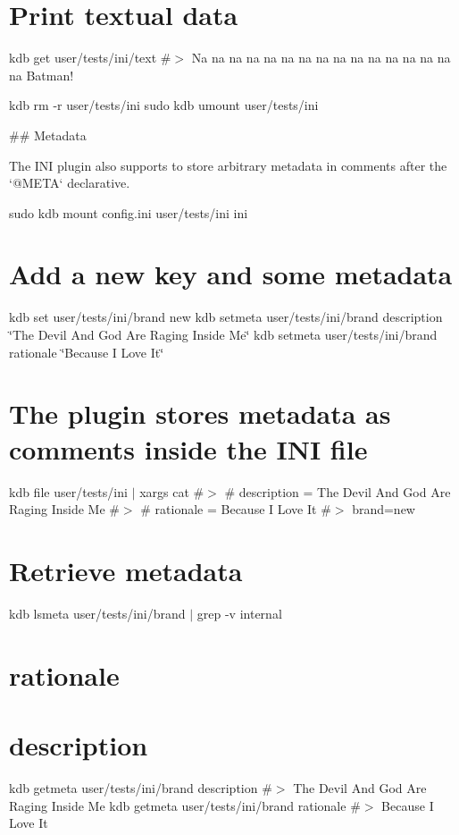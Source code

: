 \section*{Print textual data}

kdb get user/tests/ini/text \#$>$ Na na na na na na na na na na na na na na na na Batman!

kdb rm -\/r user/tests/ini sudo kdb umount user/tests/ini 
\begin{DoxyCode}
## Metadata

The INI plugin also supports to store arbitrary metadata in comments after the `@META` declarative.
\end{DoxyCode}
 sudo kdb mount config.\+ini user/tests/ini ini

\section*{Add a new key and some metadata}

kdb set user/tests/ini/brand new kdb setmeta user/tests/ini/brand description \char`\"{}\+The Devil And God Are Raging Inside Me\char`\"{} kdb setmeta user/tests/ini/brand rationale \char`\"{}\+Because I Love It\char`\"{}

\section*{The plugin stores metadata as comments inside the I\+NI file}

kdb file user/tests/ini $\vert$ xargs cat \#$>$ \# description = The Devil And God Are Raging Inside Me \#$>$ \# rationale = Because I Love It \#$>$ brand=new

\section*{Retrieve metadata}

kdb lsmeta user/tests/ini/brand $\vert$ grep -\/v \textquotesingle{}internal\textquotesingle{} \section*{rationale}

\section*{description}

kdb getmeta user/tests/ini/brand description \#$>$ The Devil And God Are Raging Inside Me kdb getmeta user/tests/ini/brand rationale \#$>$ Because I Love It

